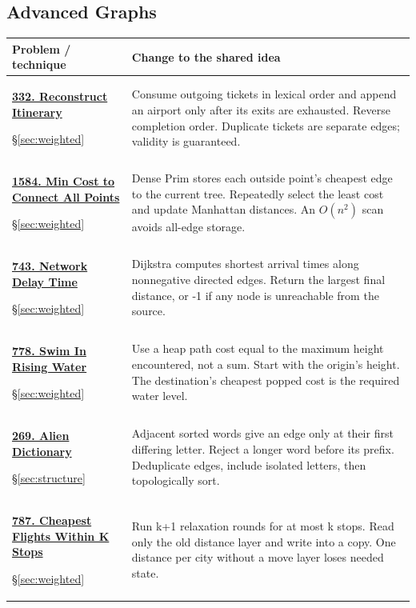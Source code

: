 \documentclass[11pt]{article}
\newcommand{\sect}[1]{\hyperref[sec:#1]{\S\ref*{sec:#1}}}
\begin{document}
\subsection{Advanced Graphs}
\begin{longtable}{@{}L{4.3cm}L{11.7cm}@{}}
\toprule Problem / technique & Change to the shared idea \\ \midrule\endhead
\hypertarget{lc332}{}\href{https://leetcode.com/problems/reconstruct-itinerary/}{\textbf{332. Reconstruct Itinerary}}\par\sect{weighted} & Consume outgoing tickets in lexical order and append an airport only after its exits are exhausted. Reverse completion order. Duplicate tickets are separate edges; validity is guaranteed.\\[4pt]
\hypertarget{lc1584}{}\href{https://leetcode.com/problems/min-cost-to-connect-all-points/}{\textbf{1584. Min Cost to Connect All Points}}\par\sect{weighted} & Dense Prim stores each outside point's cheapest edge to the current tree. Repeatedly select the least cost and update Manhattan distances. An \(O(n^2)\) scan avoids all-edge storage.\\[4pt]
\hypertarget{lc743}{}\href{https://leetcode.com/problems/network-delay-time/}{\textbf{743. Network Delay Time}}\par\sect{weighted} & Dijkstra computes shortest arrival times along nonnegative directed edges. Return the largest final distance, or -1 if any node is unreachable from the source.\\[4pt]
\hypertarget{lc778}{}\href{https://leetcode.com/problems/swim-in-rising-water/}{\textbf{778. Swim In Rising Water}}\par\sect{weighted} & Use a heap path cost equal to the maximum height encountered, not a sum. Start with the origin's height. The destination's cheapest popped cost is the required water level.\\[4pt]
\hypertarget{lc269}{}\href{https://leetcode.com/problems/alien-dictionary/}{\textbf{269. Alien Dictionary}}\par\sect{structure} & Adjacent sorted words give an edge only at their first differing letter. Reject a longer word before its prefix. Deduplicate edges, include isolated letters, then topologically sort.\\[4pt]
\hypertarget{lc787}{}\href{https://leetcode.com/problems/cheapest-flights-within-k-stops/}{\textbf{787. Cheapest Flights Within K Stops}}\par\sect{weighted} & Run k+1 relaxation rounds for at most k stops. Read only the old distance layer and write into a copy. One distance per city without a move layer loses needed state.\\[4pt]
\bottomrule
\end{longtable}
\end{document}
